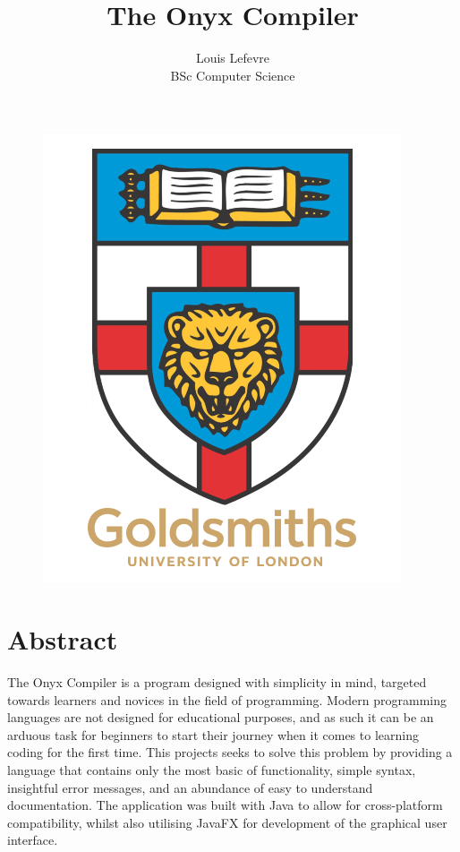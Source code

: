 \documentclass[
]{report}
\title{The Onyx Compiler}
\author{Louis Lefevre\\BSc Computer Science}
\date{}
\begin{document}
\begin{figure}
	\includegraphics[scale=0.6]{goldsmiths-logo}
	\centering
	\maketitle
\end{figure}
\thispagestyle{empty}

\chapter*{Abstract}
The Onyx Compiler is a program designed with simplicity in mind,
targeted towards learners and novices in the field of programming.
Modern programming languages are not designed for educational purposes,
and as such it can be an arduous task for beginners to start their
journey when it comes to learning coding for the first time. This
projects seeks to solve this problem by providing a language that
contains only the most basic of functionality, simple syntax, insightful
error messages, and an abundance of easy to understand documentation.
The application was built with Java to allow for cross-platform
compatibility, whilst also utilising JavaFX for development of the
graphical user interface.
\end{document}
